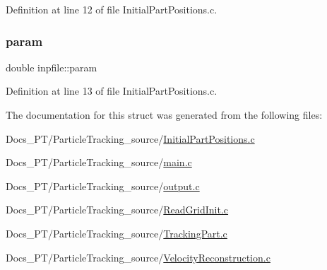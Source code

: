Definition at line 12 of file Initial\+Part\+Positions.\+c.

\mbox{\label{structinpfile_a57ff2cce78c35a8a128927da9eeccfbc}} 
\subsubsection{\texorpdfstring{param}{param}}
{\footnotesize\ttfamily double inpfile\+::param}



Definition at line 13 of file Initial\+Part\+Positions.\+c.



The documentation for this struct was generated from the following files\+:\begin{DoxyCompactItemize}
\item 
Docs\+\_\+\+P\+T/\+Particle\+Tracking\+\_\+source/\mbox{\hyperlink{_initial_part_positions_8c}{Initial\+Part\+Positions.\+c}}\item 
Docs\+\_\+\+P\+T/\+Particle\+Tracking\+\_\+source/\mbox{\hyperlink{main_8c}{main.\+c}}\item 
Docs\+\_\+\+P\+T/\+Particle\+Tracking\+\_\+source/\mbox{\hyperlink{output_8c}{output.\+c}}\item 
Docs\+\_\+\+P\+T/\+Particle\+Tracking\+\_\+source/\mbox{\hyperlink{_read_grid_init_8c}{Read\+Grid\+Init.\+c}}\item 
Docs\+\_\+\+P\+T/\+Particle\+Tracking\+\_\+source/\mbox{\hyperlink{_tracking_part_8c}{Tracking\+Part.\+c}}\item 
Docs\+\_\+\+P\+T/\+Particle\+Tracking\+\_\+source/\mbox{\hyperlink{_velocity_reconstruction_8c}{Velocity\+Reconstruction.\+c}}\end{DoxyCompactItemize}
